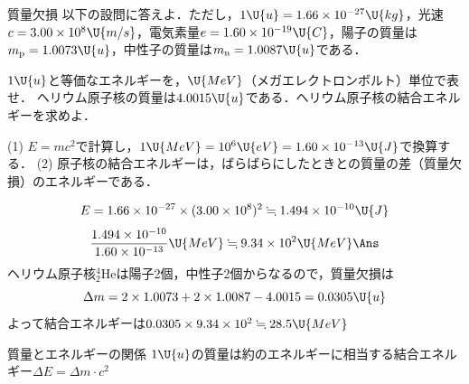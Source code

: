 \bsNeed{50mm}
\begin{reidaiunit}
\begin{reidai}{質量欠損}
\hspace{1zw}以下の設問に答えよ．ただし，$1\U{u}=1.66\times 10^{-27}\U{kg}$，光速$c=3.00\times 10^8\U{m/s}$，電気素量$e=1.60\times 10^{-19}\U{C}$，陽子の質量は$m_{\mathrm{p}}=1.0073\U{u}$，中性子の質量は$m_{\mathrm{n}}=1.0087\U{u}$である．
\begin{komon}
 $1\U{u}$と等価なエネルギーを，$\U{MeV}$（メガエレクトロンボルト）単位で表せ．
 ヘリウム原子核の質量は$4.0015\U{u}$である．ヘリウム原子核の結合エネルギーを求めよ．
\end{komon}
\end{reidai}

\begin{sisinE}
(1) $E=mc^2$で計算し，$1\U{MeV}=10^6\U{eV}=1.60\times 10^{-13}\U{J}$で換算する．
(2) 原子核の結合エネルギーは，ばらばらにしたときとの質量の差（質量欠損）のエネルギーである．
\end{sisinE}


\begin{kaitou}
\begin{komon}
 \[E=1.66\times 10^{-27}\times(3.00\times 10^8)^2\fallingdotseq 1.494\times 10^{-10}\U{J}\]
       \[\frac{1.494\times 10^{-10}}{1.60\times 10^{-13}}\U{MeV}\fallingdotseq 9.34\times 10^2\U{MeV}\Ans\]
 ヘリウム原子核${}^4_2\mathrm{He}$は陽子2個，中性子2個からなるので，質量欠損は
       \[\Delta m=2\times 1.0073+2\times 1.0087-4.0015=0.0305\U{u}\]
       よって結合エネルギーは\quad $0.0305\times 9.34\times 10^2\fallingdotseq 28.5\U{MeV}$\Ans
\end{komon}
\end{kaitou}
\end{reidaiunit}

\bsNeed{18mm}
\begin{matome}{質量とエネルギーの関係}
 \hspace{3mm} $1\U{u}$の質量は約のエネルギーに相当する\qquad 結合エネルギー$\Delta E=\Delta m\cdot c^2$
\end{matome}

